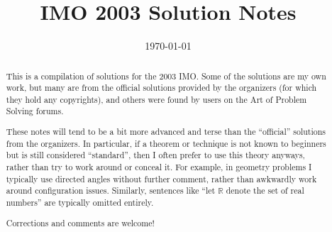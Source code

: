 \documentclass[11pt]{scrartcl}
\title{IMO 2003 Solution Notes}
\date{\today}
\begin{document}
\maketitle

\begin{abstract}
This is a compilation of solutions
for the 2003 IMO.
Some of the solutions are my own work,
but many are from the official solutions provided by the organizers
(for which they hold any copyrights),
and others were found by users on the Art of Problem Solving forums.

These notes will tend to be a bit more advanced and terse than the ``official''
solutions from the organizers.
In particular, if a theorem or technique is not known to beginners
but is still considered ``standard'', then I often prefer to
use this theory anyways, rather than try to work around or conceal it.
For example, in geometry problems I typically use directed angles
without further comment, rather than awkwardly work around configuration issues.
Similarly, sentences like ``let $\mathbb{R}$ denote the set of real numbers''
are typically omitted entirely.

Corrections and comments are welcome!
\end{abstract}

\tableofcontents
\newpage

\addtocounter{section}{-1}
\end{document}
